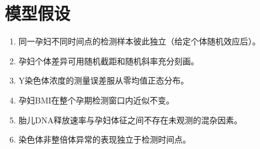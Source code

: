 \section{模型假设}

\begin{enumerate}
    \item 同一孕妇不同时间点的检测样本彼此独立（给定个体随机效应后）。
    \item 孕妇个体差异可用随机截距和随机斜率充分刻画。
    \item Y染色体浓度的测量误差服从零均值正态分布。
    \item 孕妇BMI在整个孕期检测窗口内近似不变。
    \item 胎儿DNA释放速率与孕妇体征之间不存在未观测的混杂因素。
    \item 染色体非整倍体异常的表现独立于检测时间点。
\end{enumerate}
